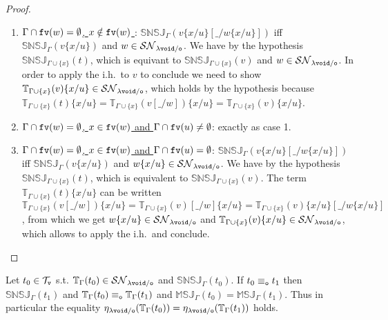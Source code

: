 \documentclass{LMCS}
\renewcommand{\>}{\rightarrow}
\def\lam{\lambda}
\def\Gam{\Gamma}
\newcommand{\isubs}[1]{ \{ #1  \} }
\newcommand{\SN}[1]{\mathcal{SN}_{#1}}
\newcommand{\fv}[1]{{\tt fv}(#1)}
\newcommand{\set}[1]{ \{ #1 \}}
\newcommand{\ems}{\emptyset}
\newcommand{\ih}{i.h.}
\newcommand{\termsv}{\mathcal{T}_{\tt v}}
\newcommand{\modulo}[2]{#1/#2}
\newcommand{\eqo}{\equiv_\osym}
\newcommand{\osym}{{\tt o}}
\newcommand{\osymb}{{\tt o}}
\newcommand{\aux}{{\tt void}}
\newcommand{\lauxm}{\lam\modulo{ \aux }{ \osymb }}
\newcommand{\snsudd}[2]{\mathbb{SNSJ}_{#1}(#2)}
\newcommand{\etamd}[2]{\mathbb{MSJ}_{#1}(#2)}
\newcommand{\surf}[2]{\mathbb{T}_{#1}(#2)}
\newcommand{\void}{\_}
\begin{document}
\begin{proof}
{\begin{itemize}
\begin{enumerate}
\begin{enumerate}
  $\snsudd{\Gam\cup\set{x}}{v}$.
\item $\surf{\Gam\cup\set{x}}{v}\isubs{x/u}\in\SN{\lauxm}$, which
  follows from the hypothesis
  since $$\surf{\Gam\cup\set{x}}{t}\isubs{x/u}=\surf{\Gam\cup\set{x}}{v}[\void/w]\isubs{x/u}=\surf{\Gam\cup\set{x}}{v}\isubs{x/u}[\void/w\isubs{x/u}]$$
\end{enumerate}
\item \underline{$\Gam\cap\fv{w}=\ems$, $x\notin \fv{w}$ }:
  $\snsudd{\Gam}{v\isubs{x/u} [\void/w\isubs{x/u}]}$ iff
  $\snsudd{\Gam}{v\isubs{x/u}}$ and $w\in\SN{\lauxm}$. We have by the
  hypothesis $\snsudd{\Gam\cup\set{x}}{t}$, which is equivant to
  $\snsudd{\Gam\cup\set{x}}{v}$ and $w\in\SN{\lauxm}$. In order to
  apply the \ih\ to $v$ to conclude we need
  to show $\surf{\Gam\cup\set{x}}{v}\isubs{x/u}\in\SN{\lauxm}$, which
  holds by the hypothesis because
  $\surf{\Gam\cup\set{x}}{t}\isubs{x/u}=\surf{\Gam\cup\set{x}}{v[\void/w]}\isubs{x/u}=\surf{\Gam\cup\set{x}}{v}\isubs{x/u}$.
\item \underline{$\Gam\cap\fv{w}=\ems$, $x\in \fv{w}$ and $\Gam\cap\fv{u}\neq\ems$}:  exactly as case 1.
\item \underline{$\Gam\cap\fv{w}=\ems$, $x\in \fv{w}$ and
  $\Gam\cap\fv{u}=\ems$}:
  $\snsudd{\Gam}{v\isubs{x/u} [\void/w\isubs{x/u}]}$ iff
  $\snsudd{\Gam}{v\isubs{x/u}}$ and $w\isubs{x/u}\in\SN{\lauxm}$. We
  have by the hypothesis $\snsudd{\Gam\cup\set{x}}{t}$,
which is equivalent to $\snsudd{\Gam\cup\set{x}}{v}$. The term
  $\surf{\Gam\cup\set{x}}{t}\isubs{x/u}$ can
  be written
  $\surf{\Gam\cup\set{x}}{v[\void/w]}\isubs{x/u}=\surf{\Gam\cup\set{x}}{v}[\void/w]\isubs{x/u}=\surf{\Gam\cup\set{x}}{v}\isubs{x/u}[\void/w\isubs{x/u}]$, 
  from which we get $w\isubs{x/u}\in\SN{\lauxm}$ and
  $\surf{\Gam\cup\set{x}}{v}\isubs{x/u}\in\SN{\lauxm}$, which allows
  to apply the \ih\ and conclude.

\end{enumerate}
\end{itemize}
}
\end{proof}


\begin{lem}
\label{l:mes-eqo}
Let $t_0 \in \termsv$ s.t.   $\surf{\Gam}{t_0} \in  \SN{\lauxm}$ and 
$\snsudd{\Gam}{t_0}$. If $t_0\eqo t_1$ then 
$\snsudd{\Gam}{t_1}$ and $\surf{\Gam}{t_0} \eqo \surf{\Gam}{t_1}$
and $\etamd{\Gam}{t_0} = \etamd{\Gam}{t_1}$. Thus in particular
the equality $\eta_{\lauxm}(\surf{\Gam}{t_0}) =\eta_{\lauxm}(\surf{\Gam}{t_1})$ holds.
\end{lem}
\end{document}
